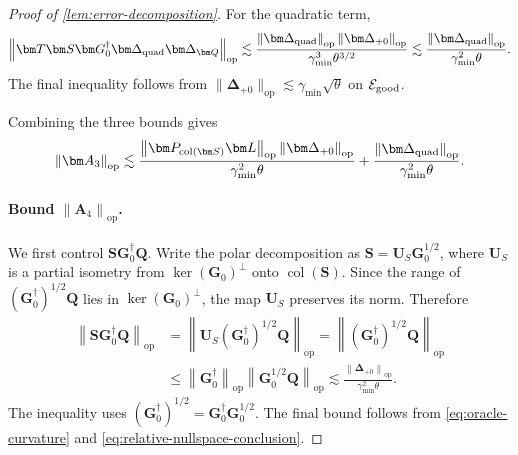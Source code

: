 \documentclass[11pt]{article}
\DeclareMathOperator{\col}{col}
\newcommand{\opn}[1]{\left\lVert #1\right\rVert_{\mathrm{op}}}
\newcommand{\cE}{\mathcal{E}}
\newcommand{\gmin}{\gamma_{\min}}
\begin{document}
\begin{proof}[Proof of \cref{lem:error-decomposition}]
For the quadratic term,
\[
  \opn{
    \bm T\bm S\bm G_0^\dagger
    \bm\Delta_{\rm quad}\bm\Delta_{\bm Q}
  }
  \lesssim
  \frac{
    \opn{\bm\Delta_{\rm quad}}
    \opn{\bm\Delta_{+0}}
  }{
    \gmin^3\theta^{3/2}
  }
  \lesssim
  \frac{\opn{\bm\Delta_{\rm quad}}}
       {\gmin^2\theta}.
\]
The final inequality follows from
$\|\bm\Delta_{+0}\|_{\mathrm{op}}
\lesssim\gmin\sqrt\theta$ on $\cE_{\rm good}$.

Combining the three bounds gives
\[
  \opn{\bm A_3}
  \lesssim
  \frac{
    \opn{\bm P_{\col(\bm S)}\bm L}
    \opn{\bm\Delta_{+0}}
  }{
    \gmin^2\theta
  }
  +
  \frac{\opn{\bm\Delta_{\rm quad}}}
       {\gmin^2\theta}.
\]

\paragraph{Bound $\opn{\bm A_4}$.}
We first control $\bm S\bm G_0^\dagger\bm Q$. Write the polar decomposition
as $\bm S=\bm U_S\bm G_0^{1/2}$, where $\bm U_S$ is a partial isometry from
$\ker(\bm G_0)^\perp$ onto $\col(\bm S)$. Since the range of
$(\bm G_0^\dagger)^{1/2}\bm Q$ lies in $\ker(\bm G_0)^\perp$, the map
$\bm U_S$ preserves its norm. Therefore
\[
\begin{aligned}
  \opn{\bm S\bm G_0^\dagger\bm Q}
  &=
  \opn{\bm U_S(\bm G_0^\dagger)^{1/2}\bm Q}
  =
  \opn{(\bm G_0^\dagger)^{1/2}\bm Q} \\
  &\le
  \opn{\bm G_0^\dagger}
  \opn{\bm G_0^{1/2}\bm Q}
  \lesssim
  \frac{\opn{\bm\Delta_{+0}}}{\gmin^2\theta}.
\end{aligned}
\]
The inequality uses
$(\bm G_0^\dagger)^{1/2}
=\bm G_0^\dagger\bm G_0^{1/2}$.
The final bound follows from \cref{eq:oracle-curvature} and
\cref{eq:relative-nullspace-conclusion}.



\end{proof}
\end{document}
